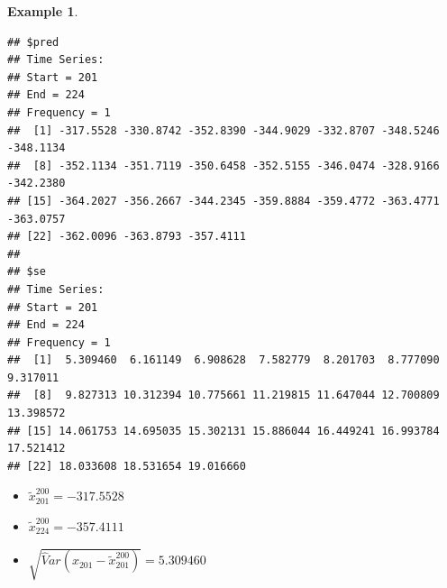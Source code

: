 \documentclass[
]{book}
\newenvironment{Shaded}{\begin{snugshade}}{\end{snugshade}}
\newcommand{\AttributeTok}[1]{\textcolor[rgb]{0.77,0.63,0.00}{#1}}
\newcommand{\CommentTok}[1]{\textcolor[rgb]{0.56,0.35,0.01}{\textit{#1}}}
\newcommand{\DecValTok}[1]{\textcolor[rgb]{0.00,0.00,0.81}{#1}}
\newcommand{\FloatTok}[1]{\textcolor[rgb]{0.00,0.00,0.81}{#1}}
\newcommand{\FunctionTok}[1]{\textcolor[rgb]{0.00,0.00,0.00}{#1}}
\newcommand{\NormalTok}[1]{#1}
\newcommand{\OtherTok}[1]{\textcolor[rgb]{0.56,0.35,0.01}{#1}}
\newcommand{\SpecialCharTok}[1]{\textcolor[rgb]{0.00,0.00,0.00}{#1}}
\theoremstyle{definition}
\theoremstyle{definition}
\newtheorem{example}{Example}[chapter]
\theoremstyle{definition}
\theoremstyle{definition}
\theoremstyle{remark}
\begin{document}
\begin{example}
\begin{verbatim}
## $pred
## Time Series:
## Start = 201 
## End = 224 
## Frequency = 1 
##  [1] -317.5528 -330.8742 -352.8390 -344.9029 -332.8707 -348.5246 -348.1134
##  [8] -352.1134 -351.7119 -350.6458 -352.5155 -346.0474 -328.9166 -342.2380
## [15] -364.2027 -356.2667 -344.2345 -359.8884 -359.4772 -363.4771 -363.0757
## [22] -362.0096 -363.8793 -357.4111
## 
## $se
## Time Series:
## Start = 201 
## End = 224 
## Frequency = 1 
##  [1]  5.309460  6.161149  6.908628  7.582779  8.201703  8.777090  9.317011
##  [8]  9.827313 10.312394 10.775661 11.219815 11.647044 12.700809 13.398572
## [15] 14.061753 14.695035 15.302131 15.886044 16.449241 16.993784 17.521412
## [22] 18.033608 18.531654 19.016660
\end{verbatim}

\begin{itemize}
\item
  \(\tilde x^{200}_{201}=-317.5528\)
\item
  \(\tilde x^{200}_{224}=-357.4111\)
\item
  \(\sqrt{\hat Var(x_{201}-\tilde x^{200}_{201})}=5.309460\)
\end{itemize}

\begin{Shaded}
\end{Shaded}

\begin{Shaded}
\end{Shaded}


\end{example}
\end{document}
